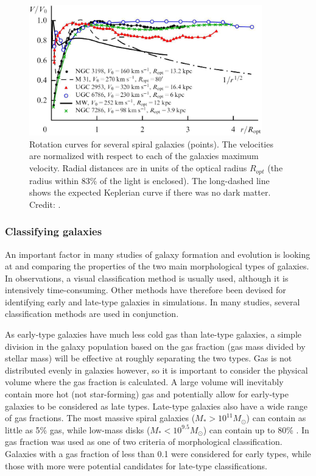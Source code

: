 \begin{figure}
    \centering
    \includegraphics[width=0.9\textwidth]{images/rotation_curves.png}
    \caption{Rotation curves for several spiral galaxies (points). The velocities are normalized with respect to each of the galaxies maximum velocity. Radial distances are in units of the optical radius $R_{opt}$ (the radius within 83\% of the light is enclosed). The long-dashed line shows the expected Keplerian curve if there was no dark matter. Credit: \textcite{Zasov2017}.}
    \label{rotation_curves}
\end{figure}

\subsubsection{Classifying galaxies}

An important factor in many studies of galaxy formation and evolution is looking at and comparing the properties of the two main morphological types of galaxies. In observations, a visual classification method is usually used, although it is intensively time-consuming. %
Other methods have therefore been devised for identifying early and late-type galaxies in simulations. In many studies, several classification methods are used in conjunction. 

As early-type galaxies have much less cold gas than late-type galaxies, a simple division in the galaxy population based on the gas fraction (gas mass divided by stellar mass) will be effective at roughly separating the two types. Gas is not distributed evenly in galaxies however, so it is important to consider the physical volume where the gas fraction is calculated. A large volume will inevitably contain more hot (not star-forming) gas and potentially allow for early-type galaxies to be considered as late types. Late-type galaxies also have a wide range of gas fractions. The most massive spiral galaxies ($M_\ast > 10^{11} M_\odot$) can contain as little as 5\% gas, while low-mass disks ($M_\ast < 10^{9.5} M_\odot$) can contain up to 80\% \parencite{Mo2010}. In \textcite{Ferrero2020} gas fraction was used as one of two criteria of morphological classification. Galaxies with a gas fraction of less than 0.1 were considered for early types, while those with more were potential candidates for late-type classifications.

